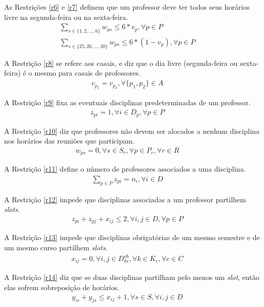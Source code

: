 As Restrições \ref{r6} e \ref{r7} definem que um professor deve ter todos seus horários livre na segunda-feira ou na sexta-feira.
\begin{eqnarray}
\label{r6}
\sum_{s\in\{{1, 2, ..., 6}\}}{w_{ps}} \leq 6*v_p, \forall{p \in{P}} &&\\
\label{r7}
\sum_{s\in\{{25, 26, ..., 30}\}}{w_{ps}} \leq 6*(1-v_p), \forall{p \in{P}} &&
\end{eqnarray}

A Restrição \ref{r8} se refere aos casais, e diz que o dia livre (segunda-feira ou sexta-feira) é o mesmo para casais de professores.
\begin{eqnarray}
\label{r8}
v_{p_1} = v_{p_2}, \forall{\{p_1,p_2\} \in{A}} &&
\end{eqnarray}

A Restrição \ref{r9} fixa as eventuais disciplinas predeterminadas de um professor.
\begin{eqnarray}
\label{r9}
z_{pi} = 1, \forall{i \in{D_p}}, \forall{p \in{P}} &&
\end{eqnarray}

A Restrição \ref{r10} diz que professores não devem ser alocados a nenhum disciplina nos horários das reuniões que participam.
\begin{eqnarray}
\label{r10}
w_{ps} = 0, \forall{s \in{S_r}}, \forall{p \in{P_r}}, \forall{r \in{R}} &&
\end{eqnarray}

A Restrição \ref{r11} define o número de professores associados a uma disciplina.
\begin{eqnarray}
\label{r11}
\sum_{p\in{P}}^{}{z_{pi}} = n_i, \forall{i}\in{D} &&
\end{eqnarray}

A Restrição \ref{r12} impede que disciplinas associadas a um professor partilhem \textit{slots}.
\begin{eqnarray}
\label{r12}
z_{pi} + z_{pj} + x_{ij} \leq 2, \forall{i,j}\in{D}, \forall{p}\in{P} &&
\end{eqnarray}

A Restrição \ref{r13} impede que disciplinas obrigatórias de um mesmo semestre e de um mesmo curso partilhem \textit{slots}.
\begin{eqnarray}
\label{r13}
x_{ij} = 0, \forall{i,j}\in{D_{kc}^{ob}}, \forall{k}\in{K_c}, \forall{c}\in{C} &&
\end{eqnarray}

A Restrição \ref{r14} diz que se duas disciplinas partilham pelo menos um \textit{slot}, então elas sofrem sobreposição de horários.
\begin{eqnarray}
\label{r14}
y_{is} + y_{js} \leq x_{ij} + 1, \forall{s}\in{S}, \forall{i, j}\in{D} &&
\end{eqnarray}

